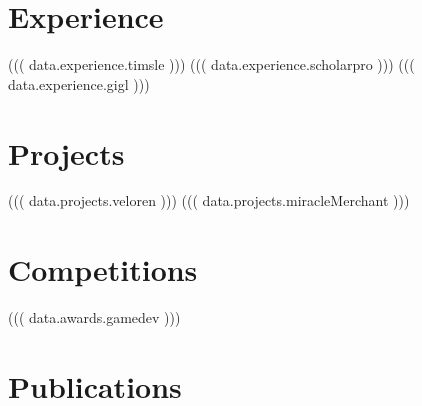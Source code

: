 \documentclass[]{deedy-resume-openfont}
\begin{document}
\begin{minipage}[t]{0.66\textwidth}


\section{Experience}

((( data.experience.timsle )))
((( data.experience.scholarpro )))
((( data.experience.gigl )))

\section{Projects}

((( data.projects.veloren )))
((( data.projects.miracleMerchant )))

\section{Competitions}

((( data.awards.gamedev )))


\section{Publications} 
\renewcommand\refname{\vskip -1.5em} %


\nocite{*}

\end{minipage} 
\end{document}
